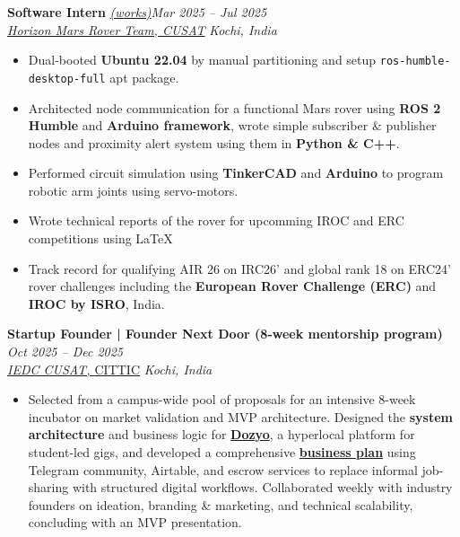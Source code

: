 \documentclass[a4paper]{article}
\begin{document}
\textbf{Software Intern} \href{https://github.com/aaromalonline/aaromalanil_horizon_s2}{\textit{(works)}}\hfill \textit{Mar 2025 -- Jul 2025} \\
\textit{\href{https://roverchallenge.eu/team/horizon-2024/}{Horizon Mars Rover Team, CUSAT}} \hfill \textit{Kochi, India}
\begin{itemize}
    \item Dual-booted \textbf{Ubuntu 22.04} by manual partitioning and setup \texttt{ros-humble-desktop-full} apt package.
    \item Architected node communication for a functional Mars rover using \textbf{ROS 2 Humble} and \textbf{Arduino framework}, wrote simple subscriber \& publisher nodes and proximity alert system using them in \textbf{Python \& C++}.
    \item Performed circuit simulation using \textbf{TinkerCAD} and \textbf{Arduino} to program robotic arm joints using servo-motors.
    \item Wrote technical reports of the rover for upcomming IROC and ERC competitions using \LaTeX\
    \item Track record for qualifying AIR 26 on IRC26' and global rank 18 on ERC24' rover challenges including the \textbf{European Rover Challenge (ERC)} and \textbf{IROC by ISRO}, India.
\end{itemize}

\textbf{Startup Founder | Founder Next Door (8-week mentorship program)} \hfill \textit{Oct 2025 -- Dec 2025} \\
\textit{\href{https://iedccusat.vercel.app/}{IEDC CUSAT, }}{\href{https://cittic.cusat.ac.in/}{CITTIC}} \hfill \textit{Kochi, India}
\begin{itemize}
    \item[] Selected from a campus-wide pool of proposals for an intensive 8-week incubator on market validation and MVP architecture. Designed the \textbf{system architecture} and business logic for \href{https://dozyo.vercel.app/}{\textbf{Dozyo}}, a hyperlocal platform for student-led gigs, and developed a comprehensive \href{https://aaromalonline.notion.site/Dozyo-1d91d429a96d80f18f9afc22c54f1637}{\textbf{business plan}} using Telegram community, Airtable, and escrow services to replace informal job-sharing with structured digital workflows. Collaborated weekly with industry founders on ideation, branding \& marketing, and technical scalability, concluding with an MVP presentation.
\end{itemize}
\vspace*{3mm}
\end{document}
